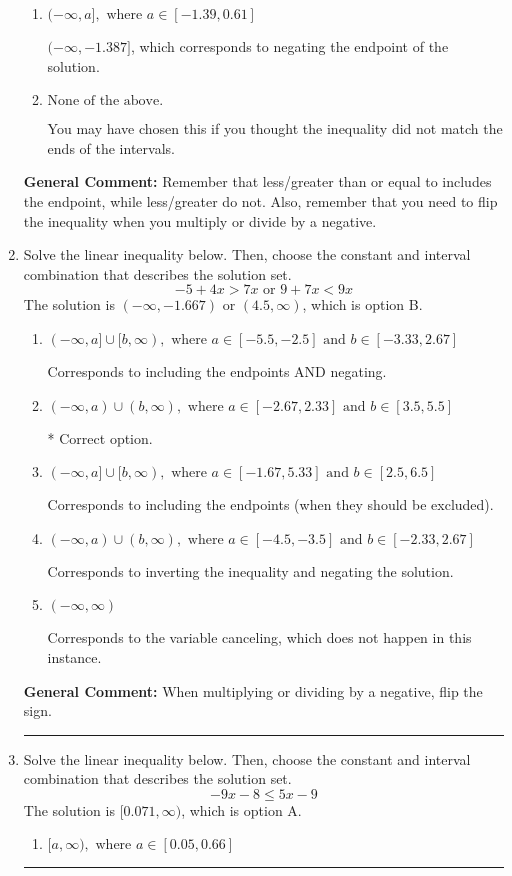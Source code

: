 \documentclass{extbook}[14pt]
\newcommand{\litem}[1]{\item #1

\rule{\textwidth}{0.4pt}}
\begin{document}
\begin{enumerate}
{\begin{enumerate}[label=\Alph*.]
 $[-1.387, \infty)$, which corresponds to switching the direction of the interval AND negating the endpoint. You likely did this if you did not flip the inequality when dividing by a negative as well as not moving values over to a side properly.
\item \( (-\infty, a], \text{ where } a \in [-1.39, 0.61] \)

 $(-\infty, -1.387]$, which corresponds to negating the endpoint of the solution.
\item \( \text{None of the above}. \)

You may have chosen this if you thought the inequality did not match the ends of the intervals.
\end{enumerate}

\textbf{General Comment:} Remember that less/greater than or equal to includes the endpoint, while less/greater do not. Also, remember that you need to flip the inequality when you multiply or divide by a negative.
}
\litem{
Solve the linear inequality below. Then, choose the constant and interval combination that describes the solution set.
\[ -5 + 4 x > 7 x \text{ or } 9 + 7 x < 9 x \]The solution is \( (-\infty, -1.667) \text{ or } (4.5, \infty) \), which is option B.\begin{enumerate}[label=\Alph*.]
\item \( (-\infty, a] \cup [b, \infty), \text{ where } a \in [-5.5, -2.5] \text{ and } b \in [-3.33, 2.67] \)

Corresponds to including the endpoints AND negating.
\item \( (-\infty, a) \cup (b, \infty), \text{ where } a \in [-2.67, 2.33] \text{ and } b \in [3.5, 5.5] \)

 * Correct option.
\item \( (-\infty, a] \cup [b, \infty), \text{ where } a \in [-1.67, 5.33] \text{ and } b \in [2.5, 6.5] \)

Corresponds to including the endpoints (when they should be excluded).
\item \( (-\infty, a) \cup (b, \infty), \text{ where } a \in [-4.5, -3.5] \text{ and } b \in [-2.33, 2.67] \)

Corresponds to inverting the inequality and negating the solution.
\item \( (-\infty, \infty) \)

Corresponds to the variable canceling, which does not happen in this instance.
\end{enumerate}

\textbf{General Comment:} When multiplying or dividing by a negative, flip the sign.
}
\litem{
Solve the linear inequality below. Then, choose the constant and interval combination that describes the solution set.
\[ -9x -8 \leq 5x -9 \]The solution is \( [0.071, \infty) \), which is option A.\begin{enumerate}[label=\Alph*.]
\item \( [a, \infty), \text{ where } a \in [0.05, 0.66] \)


\end{enumerate}}
\end{enumerate}
\end{document}
